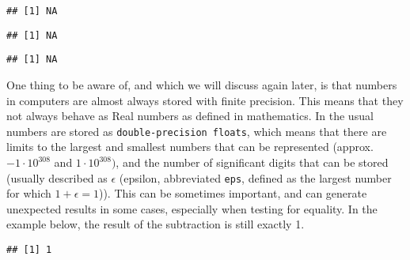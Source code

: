 \documentclass[paper=a4,10pt,div=17,headsepline,BCOR=12mm,twoside,open=right]{scrbook}\usepackage{knitr}
\begin{document}
\begin{knitrout}\footnotesize
{}\color{fgcolor}\begin{kframe}
\begin{alltt}
 \hlkwb{<-} 
\end{alltt}
\begin{verbatim}
## [1] NA
\end{verbatim}
\begin{alltt}
 \hlopt{+} 
\end{alltt}
\begin{verbatim}
## [1] NA
\end{verbatim}
\begin{alltt}
 \hlopt{+} 
\end{alltt}
\begin{verbatim}
## [1] NA
\end{verbatim}
\end{kframe}
\end{knitrout}

One thing to be aware of, and which we will discuss again later, is that numbers in computers are almost always stored with finite precision. This means that they not always behave as Real numbers as defined in mathematics. In \R the usual numbers are stored as \texttt{double-precision floats}, which means that there are limits to the largest and smallest numbers that can be represented (approx. $-1 \cdot 10^{308}$ and $1 \cdot 10^{308})$, and the number of significant digits that can be stored (usually described as $\epsilon$ (epsilon, abbreviated \texttt{eps}, defined as the largest number for which $ 1 + \epsilon = 1$)). This can be sometimes important, and can generate unexpected results in some cases, especially when testing for equality. In the example below, the result of the subtraction is still exactly 1. \label{par:float}

\begin{knitrout}\footnotesize
{}\color{fgcolor}\begin{kframe}
\begin{alltt}
 \hlopt{-} 
\end{alltt}
\begin{verbatim}
## [1] 1
\end{verbatim}
\end{kframe}
\end{knitrout}
\end{document}
